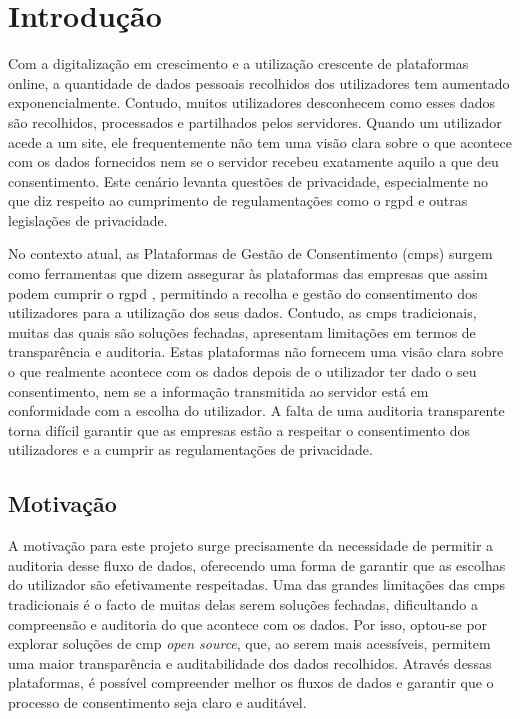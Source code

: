 \chapter{Introdução}
\label{cap:introducao}

Com a digitalização em crescimento e a utilização crescente de plataformas online, a quantidade de dados pessoais recolhidos dos utilizadores tem aumentado exponencialmente. Contudo, muitos utilizadores desconhecem como esses dados são recolhidos, processados e partilhados pelos servidores. Quando um utilizador acede a um site, ele frequentemente não tem uma visão clara sobre o que acontece com os dados fornecidos nem se o servidor recebeu exatamente aquilo a que deu consentimento. Este cenário levanta questões de privacidade, especialmente no que diz respeito ao cumprimento de regulamentações como o \acrfull{rgpd} e outras legislações de privacidade.

No contexto atual, as Plataformas de Gestão de Consentimento (\acrshort{cmp}s) surgem como ferramentas que dizem assegurar às plataformas das empresas que assim podem cumprir o \acrshort{rgpd} \citep{Santos2021}, permitindo a recolha e gestão do consentimento dos utilizadores para a utilização dos seus dados. Contudo, as \acrshort{cmp}s tradicionais, muitas das quais são soluções fechadas, apresentam limitações em termos de transparência e auditoria. Estas plataformas não fornecem uma visão clara sobre o que realmente acontece com os dados depois de o utilizador ter dado o seu consentimento, nem se a informação transmitida ao servidor está em conformidade com a escolha do utilizador. A falta de uma auditoria transparente torna difícil garantir que as empresas estão a respeitar o consentimento dos utilizadores e a cumprir as regulamentações de privacidade.

\section{Motivação}

A motivação para este projeto surge precisamente da necessidade de permitir a auditoria desse fluxo de dados, oferecendo uma forma de garantir que as escolhas do utilizador são efetivamente respeitadas. Uma das grandes limitações das \acrshort{cmp}s tradicionais é o facto de muitas delas serem soluções fechadas, dificultando a compreensão e auditoria do que acontece com os dados. Por isso, optou-se por explorar soluções de \acrshort{cmp} \textit{open source}, que, ao serem mais acessíveis, permitem uma maior transparência e auditabilidade dos dados recolhidos. Através dessas plataformas, é possível compreender melhor os fluxos de dados e garantir que o processo de consentimento seja claro e auditável.

